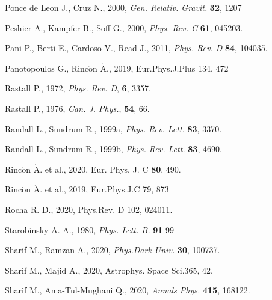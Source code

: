 \documentclass[]{aastex631}
\begin{document}
\begin{thebibliography}{99}
  Ponce de Leon J.,  Cruz N., 2000, {\em Gen. Relativ. Gravit.} {\bf 32}, 1207 

  Peshier A.,  Kampfer B., Soff G.,  2000, {\em  Phys. Rev. C} {\bf 61}, 045203. 

  Pani P., Berti E.,  Cardoso V., Read J.,  2011, {\em Phys. Rev. D} { \bf{84}}, 104035.

  Panotopoulos G.,  Rinc$\acute{\text{o}}$n $\acute{\text{A}}$., 2019, Eur.Phys.J.Plus 134, 472

   Rastall P.,  1972, {\em Phys. Rev. D}, {\bf 6}, 3357.

   Rastall P.,  1976, { \em Can. J. Phys.}, {\bf 54}, 66.

  Randall L.,  Sundrum R.,  1999a, {\em  Phys. Rev. Lett.} {\bf 83}, 3370.

  Randall L.,  Sundrum R.,  1999b, {\em Phys. Rev. Lett.} {\bf 83}, 4690. 

  Rinc$\acute{\text{o}}$n $\acute{\text{A}}$. et al., 2020, Eur. Phys. J. C \textbf{80}, 490.

   Rinc$\acute{\text{o}}$n $\acute{\text{A}}$. et al., 2019, Eur.Phys.J.C 79, 873 

  Rocha R. D., 2020, Phys.Rev. D 102, 024011.

  Starobinsky A. A., 1980, {\em Phys. Lett. B.} {\bf 91}  99 

  Sharif M., Ramzan A.,  2020, {\em  Phys.Dark Univ.} {\bf  30},  100737.

  Sharif M.,  Majid A., 2020, Astrophys. Space Sci.365, 42. 

  Sharif M., Ama-Tul-Mughani Q.,  2020, {\em  Annals Phys.} {\bf  415}, 168122.


\end{thebibliography}
\end{document}
